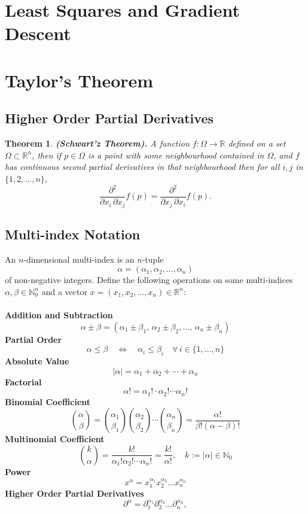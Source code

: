 \documentclass[11pt,a4paper]{article}
\theoremstyle{definition}
\theoremstyle{plain}
\newtheorem{theorem}{Theorem}[section]
\newcommand{\N}{\mathbb{N}}
\newcommand{\R}{\mathbb{R}}
\renewcommand{\tt}[1]{\textnormal{\textbf{(#1).}}} %
\begin{document}
	\newpage
	
	\section{Least Squares and Gradient Descent}
	
	\newpage
	
	\section{Taylor's Theorem}
	\subsection{Higher Order Partial Derivatives}
	\begin{theorem}
		\tt{Schwart'z Theorem}
		A function $f \colon \Omega \to \R$ defined
		on a set $\Omega \subset \R^n$, then if $p \in \Omega$ is a point
		with some neighbourhood contained in $\Omega$, and $f$ has continuous
		second partial derivatives in that neighbourhood then for all $i,j$
		in $\{1,2,\dots,n\}$,
		\[
			{\frac {\partial ^{2}}{\partial x_{i}\,
			\partial x_{j}}}f({p})={\frac {\partial ^{2}}{\partial x_{j}\,
			\partial x_{i}}}f({p}).
		\]
	\end{theorem}
	
	\subsection{Multi-index Notation}
	An $n$-dimensional multi-index is an $n$-tuple
  \[
    \alpha = (\alpha_{1},\alpha_{2},\ldots,\alpha_{n})
  \]
	of non-negative integers. Define the following operations on some
	multi-indices $\alpha ,\beta \in \N_{0}^{n}$ and a vector
	$x=(x_{1},x_{2},\ldots ,x_{n})\in \mathbb {R} ^{n}$: \\
  \phantom{} \\
	\textbf{Addition and Subtraction}
	\[
		\alpha \pm \beta =
		(\alpha _{1}\pm \beta _{1},\,\alpha _{2}\pm 
		\beta _{2},\ldots ,\,\alpha _{n}\pm \beta _{n})
	\]
	\textbf{Partial Order}
	\[
		\alpha \leq \beta \quad \Leftrightarrow \quad 
		\alpha _{i}\leq \beta _{i}\quad \forall \,i\in \{1,\ldots ,n\}
	\]
	\textbf{Absolute Value}
	\[
		|\alpha |=\alpha _{1}+\alpha _{2}+\cdots +\alpha _{n}
	\]
	\textbf{Factorial}
	\[
		\alpha !=\alpha _{1}!\cdot \alpha _{2}!\cdots \alpha _{n}!
	\]
	\textbf{Binomial Coefficient}
	\[
		{\binom {\alpha}{\beta}} = 
		{\binom {\alpha_{1}}{\beta_{1}}}
		{\binom {\alpha_{2}}{\beta_{2}}}\cdots 
		{\binom {\alpha_{n}}{\beta_{n}}} = 
		{\frac {\alpha!}{\beta! (\alpha-\beta)!}}
	\]
	\textbf{Multinomial Coefficient}
	\[
		{\binom {k}{\alpha}} = 
		{\frac {k!}{\alpha_{1}!\alpha_{2}! \cdots \alpha_{n}!}} = 
		{\frac {k!}{\alpha!}}, 
		\quad k:=|\alpha |\in \mathbb {N}_{0}
	\]
	\textbf{Power}
	\[
		x^{\alpha} = 
		x_{1}^{\alpha_{1}}x_{2}^{\alpha_{2}}\ldots x_{n}^{\alpha_{n}}
	\]
	\textbf{Higher Order Partial Derivatives}
	\[
		\partial^{\alpha} = 
		\partial_{1}^{\alpha _{1}}
		\partial _{2}^{\alpha _{2}} \ldots 
		\partial _{n}^{\alpha _{n}},
	\]
\end{document}
